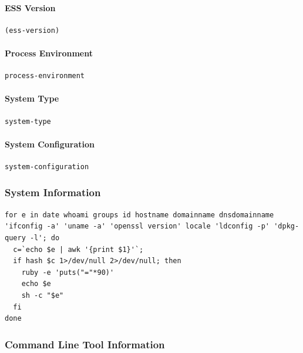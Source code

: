 \documentclass[11pt]{article}
\begin{document}
\paragraph{ESS Version}
\label{sec:orgbe44650}

\begin{verbatim}
(ess-version)
\end{verbatim}

\paragraph{Process Environment}
\label{sec:orgcf62915}

\begin{verbatim}
process-environment
\end{verbatim}

\paragraph{System Type}
\label{sec:orgb405fe4}

\begin{verbatim}
system-type
\end{verbatim}

\paragraph{System Configuration}
\label{sec:org2bfafe6}

\begin{verbatim}
system-configuration
\end{verbatim}

\subsubsection{System Information}
\label{sec:orga551ffa}

\begin{verbatim}
for e in date whoami groups id hostname domainname dnsdomainname 'ifconfig -a' 'uname -a' 'openssl version' locale 'ldconfig -p' 'dpkg-query -l'; do
  c=`echo $e | awk '{print $1}'`;
  if hash $c 1>/dev/null 2>/dev/null; then 
    ruby -e 'puts("="*90)'
    echo $e
    sh -c "$e"
  fi
done
\end{verbatim}

\subsubsection{Command Line Tool Information}
\label{sec:org9cfac48}
\end{document}
